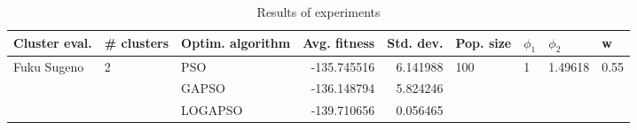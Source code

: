 \begin{table}
\centering
\caption{Results of experiments}
\begin{tabular}{lllrrllll}
\toprule
               Cluster eval. &        \# clusters & Optim. algorithm &  Avg. fitness &  Std. dev. &            Pop. size &         $\phi_{1}$ &               $\phi_{2}$ &                     w \\
\midrule
\multirow{3}{*}{Fuku Sugeno} & \multirow{3}{*}{2} &              PSO &   -135.745516 &   6.141988 & \multirow{3}{*}{100} & \multirow{3}{*}{1} & \multirow{3}{*}{1.49618} & \multirow{3}{*}{0.55} \\
                             &                    &            GAPSO &   -136.148794 &   5.824246 &                      &                    &                          &                       \\
                             &                    &          LOGAPSO &   -139.710656 &   0.056465 &                      &                    &                          &                       \\
\bottomrule
\end{tabular}
\end{table}
